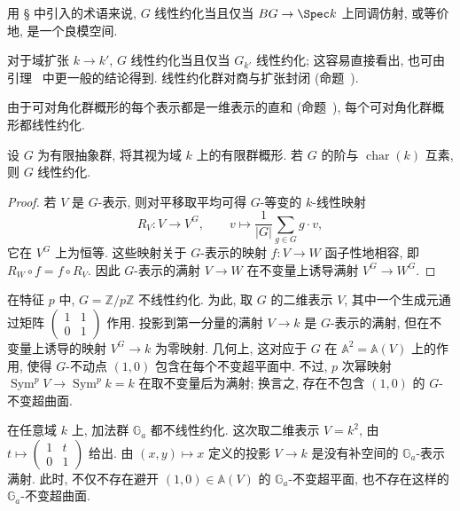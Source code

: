\begin{remark}\label{src:B.1.39}
用 \S{} 中引入的术语来说, $G$ 线性约化当且仅当 $BG\to\Spec k$ 上同调仿射, 或等价地, 是一个良模空间.

对于域扩张 $k\to k'$, $G$ 线性约化当且仅当 $G_{k'}$ 线性约化; 这容易直接看出, 也可由引理~ 中更一般的结论得到. 线性约化群对商与扩张封闭 (命题~).
\end{remark}
\clearpage
\begin{example}[可对角化群]\label{src:B.1.40}
由于可对角化群概形的每个表示都是一维表示的直和 (命题~), 每个可对角化群概形都线性约化.
\end{example}
\begin{proposition}[Maschke 定理]\label{src:B.1.41}
设 $G$ 为有限抽象群, 将其视为域 $k$ 上的有限群概形. 若 $G$ 的阶与 $\operatorname{char}(k)$ 互素, 则 $G$ 线性约化.
\end{proposition}
\begin{proof}
若 $V$ 是 $G$-表示, 则对平移取平均可得 $G$-等变的 $k$-线性映射
\begin{equation}\label{src:B.1.42}
R_V:V\to V^G,\qquad v\mapsto\frac1{|G|}\sum_{g\in G}g\cdot v,
\end{equation}
它在 $V^G$ 上为恒等. 这些映射关于 $G$-表示的映射 $f:V\to W$ 函子性地相容, 即 $R_W\circ f=f\circ R_V$. 因此 $G$-表示的满射 $V\to W$ 在不变量上诱导满射 $V^G\to W^G$.
\end{proof}
\begin{example}\label{src:B.1.43}
在特征 $p$ 中, $G=\mathbb Z/p\mathbb Z$ 不线性约化. 为此, 取 $G$ 的二维表示 $V$, 其中一个生成元通过矩阵 $\begin{pmatrix}1&1\\0&1\end{pmatrix}$ 作用. 投影到第一分量的满射 $V\to k$ 是 $G$-表示的满射, 但在不变量上诱导的映射 $V^G\to k$ 为零映射. 几何上, 这对应于 $G$ 在 $\mathbb A^2=\mathbb A(V)$ 上的作用, 使得 $G$-不动点 $(1,0)$ 包含在每个不变超平面中. 不过, $p$ 次幂映射 $\operatorname{Sym}^pV\to\operatorname{Sym}^pk=k$ 在取不变量后为满射; 换言之, 存在不包含 $(1,0)$ 的 $G$-不变超曲面.
\end{example}
\begin{example}\label{src:B.1.44}
在任意域 $k$ 上, 加法群 $\mathbb G_a$ 都不线性约化. 这次取二维表示 $V=k^2$, 由 $t\mapsto\begin{pmatrix}1&t\\0&1\end{pmatrix}$ 给出. 由 $(x,y)\mapsto x$ 定义的投影 $V\to k$ 是没有补空间的 $\mathbb G_a$-表示满射. 此时, 不仅不存在避开 $(1,0)\in\mathbb A(V)$ 的 $\mathbb G_a$-不变超平面, 也不存在这样的 $\mathbb G_a$-不变超曲面.
\end{example}
